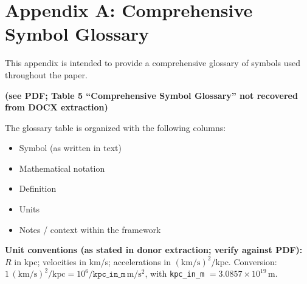 \section{Appendix A: Comprehensive Symbol Glossary}

This appendix is intended to provide a comprehensive glossary of symbols used throughout the paper.

\textbf{(see PDF; Table 5 ``Comprehensive Symbol Glossary'' not recovered from DOCX extraction)}

\noindent The glossary table is organized with the following columns:
\begin{itemize}
	\item Symbol (as written in text)
	\item Mathematical notation
	\item Definition
	\item Units
	\item Notes / context within the framework
\end{itemize}

\noindent \textbf{Unit conventions (as stated in donor extraction; verify against PDF):} $R$ in kpc; velocities in km/s; accelerations in $(\mathrm{km/s})^2/\mathrm{kpc}$. Conversion: $1\, (\mathrm{km/s})^2/\mathrm{kpc} = 10^6/\texttt{kpc\_in\_m}\,\mathrm{m/s^2}$, with \texttt{kpc\_in\_m} $= 3.0857\times 10^{19}\,\mathrm{m}$.
